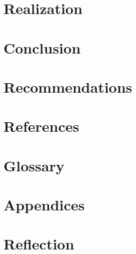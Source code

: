 \documentclass[11pt,conference]{IEEEtran}
\begin{document}
\section{Realization}

%
\section{Conclusion}

%
\section{Recommendations}

%
\section{References}

%
\section{Glossary}

%
\section{Appendices}

%
\section{Reflection}
\end{document}
